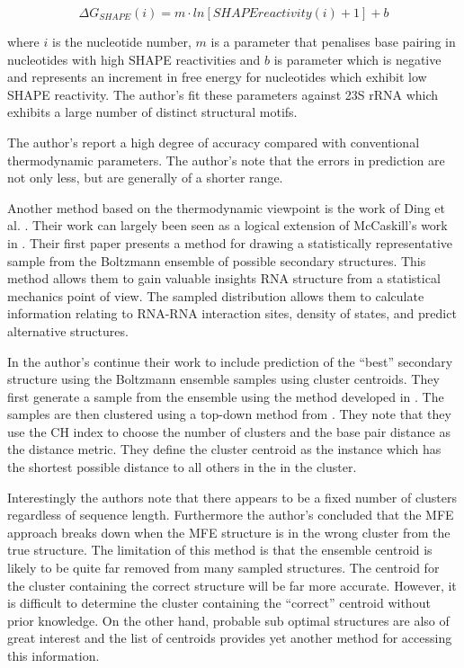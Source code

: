 \documentclass[journal]{IEEEtran}
\begin{document}
\begin{equation}
	\Delta G_{SHAPE}(i) = m \cdot ln[SHAPEreactivity(i) + 1] + b
\end{equation}

where $i$ is the nucleotide number, $m$ is a parameter that penalises base pairing in nucleotides with high SHAPE reactivities and $b$ is parameter which is negative and represents an increment in free energy for nucleotides which exhibit low SHAPE reactivity. The author's fit these parameters against 23S rRNA which exhibits a large number of distinct structural motifs.

The author's report a high degree of accuracy compared with conventional thermodynamic parameters. The author's note that the errors in prediction are not only less, but are generally of a shorter range.

Another method based on the thermodynamic viewpoint is the work of Ding et al. \cite{ding2003statistical, ding2005rna}. Their work can largely been seen as a logical extension of McCaskill's work in \cite{mccaskill1990equilibrium}. Their first paper \cite{ding2003statistical} presents a method for drawing a statistically representative sample from the Boltzmann ensemble of possible secondary structures. This method allows them to gain valuable insights RNA structure from a statistical mechanics point of view. The sampled distribution allows them to calculate information relating to RNA-RNA interaction sites, density of states, and predict alternative structures.

In \cite{ding2005rna} the author's continue their work to include prediction of the ``best'' secondary structure using the Boltzmann ensemble samples using cluster centroids. They first generate a sample from the ensemble using the method developed in \cite{ding2003statistical}. The samples are then clustered using a top-down method from \cite{rousseeuw1990finding}. They note that they use the CH index to choose the number of clusters and the base pair distance as the distance metric. They define the cluster centroid as the instance which has the shortest possible distance to all others in the in the cluster.

Interestingly the authors note that there appears to be a fixed number of clusters regardless of sequence length. Furthermore the author's concluded that the MFE approach breaks down when the MFE structure is in the wrong cluster from the true structure. The limitation of this method is that the ensemble centroid is likely to be quite far removed from many sampled structures. The centroid for the cluster containing the correct structure will be far more accurate. However, it is difficult to determine the cluster containing the ``correct'' centroid without prior knowledge. On the other hand, probable sub optimal structures are also of great interest and the list of centroids provides yet another method for accessing this information.
\end{document}
